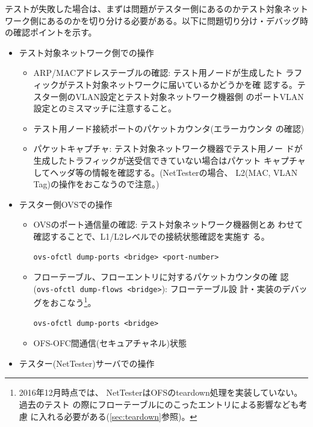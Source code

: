 テストが失敗した場合は、まずは問題がテスター側にあるのかテスト対象ネット
ワーク側にあるのかを切り分ける必要がある。以下に問題切り分け・デバッグ時
の確認ポイントを示す。
\begin{itemize}
 \item テスト対象ネットワーク側での操作
       \begin{itemize}
        \item ARP/MACアドレステーブルの確認: テスト用ノードが生成したト
              ラフィックがテスト対象ネットワークに届いているかどうかを確
              認する。テスター側のVLAN設定とテスト対象ネットワーク機器側
              のポートVLAN設定とのミスマッチに注意すること。
        \item テスト用ノード接続ポートのパケットカウンタ(エラーカウンタ
              の確認)
        \item パケットキャプチャ: テスト対象ネットワーク機器でテスト用ノー
              ドが生成したトラフィックが送受信できていない場合はパケット
              キャプチャしてヘッダ等の情報を確認する。(NetTesterの場合、
              L2(MAC, VLAN Tag)の操作をおこなうので注意。)
       \end{itemize}
 \item テスター側OVSでの操作
       \begin{itemize}
        \item OVSのポート通信量の確認: テスト対象ネットワーク機器側とあ
              わせて確認することで、L1/L2レベルでの接続状態確認を実施す
              る。
\begin{lstlisting}
ovs-ofctl dump-ports <bridge> <port-number>
\end{lstlisting}
        \item フローテーブル、フローエントリに対するパケットカウンタの確
              認(\verb|ovs-ofctl dump-flows <bridge>|): フローテーブル設
              計・実装のデバッグをおこなう\footnote{2016年12月時点では、
              NetTesterはOFSのteardown処理を実装していない。過去のテスト
              の際にフローテーブルにのこったエントリによる影響なども考慮
              に入れる必要がある(\ref{sec:teardown}参照)。}。
\begin{lstlisting}
ovs-ofctl dump-ports <bridge>
\end{lstlisting}
        \item OFS-OFC間通信(セキュアチャネル)状態
       \end{itemize}
 \item テスター(NetTester)サーバでの操作
       \begin{itemize}

\end{itemize}
\end{itemize}
